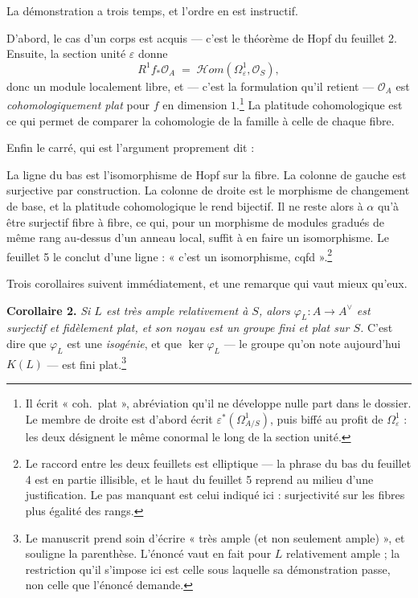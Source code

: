 \documentclass[11pt,a4paper]{article}
\begin{document}
La démonstration a trois temps, et l'ordre en est instructif.

D'abord, le cas d'un corps est acquis — c'est le théorème de Hopf du feuillet
2. Ensuite, la section unité $\varepsilon$ donne
\[
  R^{1}f_{*}\mathcal{O}_{A} \;=\;
  \mathcal{H}om\!\left(\Omega^{1}_{\varepsilon}, \mathcal{O}_{S}\right),
\]
donc un module localement libre, et — c'est la formulation qu'il retient —
$\mathcal{O}_{A}$ est \emph{cohomologiquement plat} pour $f$ en dimension
$1$.\footnote{Il écrit « coh.\ plat », abréviation qu'il ne développe nulle part
dans le dossier. Le membre de droite est d'abord écrit
$\varepsilon^{*}(\Omega^{1}_{A/S})$, puis biffé au profit de
$\Omega^{1}_{\varepsilon}$ : les deux désignent le même conormal le long de la
section unité.} La platitude cohomologique est ce qui permet de comparer la
cohomologie de la famille à celle de chaque fibre.

Enfin le carré, qui est l'argument proprement dit :


La ligne du bas est l'isomorphisme de Hopf sur la fibre. La colonne de gauche
est surjective par construction. La colonne de droite est le morphisme de
changement de base, et la platitude cohomologique le rend bijectif. Il ne
reste alors à $\alpha$ qu'à être surjectif fibre à fibre, ce qui, pour un
morphisme de modules gradués de même rang au-dessus d'un anneau local, suffit
à en faire un isomorphisme. Le feuillet 5 le conclut d'une ligne : « c'est un
isomorphisme, cqfd ».\footnote{Le raccord entre les deux feuillets est
elliptique — la phrase du bas du feuillet 4 est en partie illisible, et le
haut du feuillet 5 reprend au milieu d'une justification. Le pas manquant est
celui indiqué ici : surjectivité sur les fibres plus égalité des rangs.}

Trois corollaires suivent immédiatement, et une remarque qui vaut mieux
qu'eux.

\textbf{Corollaire 2.} \emph{Si $L$ est très ample relativement à $S$, alors
$\varphi_{L} : A \to A^{\vee}$ est surjectif et fidèlement plat, et son noyau
est un groupe fini et plat sur $S$.} C'est dire que $\varphi_{L}$ est une
\emph{isogénie}, et que $\ker \varphi_{L}$ — le groupe qu'on note aujourd'hui
$K(L)$ — est fini plat.\footnote{Le manuscrit prend soin d'écrire « très ample
(et non seulement ample) », et souligne la parenthèse. L'énoncé vaut en fait
pour $L$ relativement ample ; la restriction qu'il s'impose ici est celle sous
laquelle sa démonstration passe, non celle que l'énoncé demande.}
\end{document}
